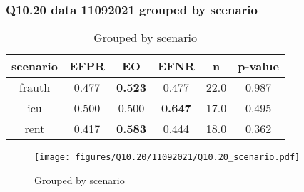 \subsubsection{Q10.20 data 11092021 grouped by scenario}

\begin{comment}
               EFPR        EO      EFNR     n    pvalue
(frauth,)  0.477273  0.522727  0.477273  22.0  0.986772
(icu,)     0.500000  0.500000  0.647059  17.0  0.494974
(rent,)    0.416667  0.583333  0.444444  18.0  0.361935
\end{comment}

\begin{table}[h]
    \centering
    \begin{tabular}{|c|c|c|c|c|c|}
        \hline
        scenario & EFPR & EO & EFNR & n & p-value\\
        \hline
        frauth & 0.477 & \textbf{0.523} & 0.477 & 22.0 & 0.987\\
		icu & 0.500 & 0.500 & \textbf{0.647} & 17.0 & 0.495\\
		rent & 0.417 & \textbf{0.583} & 0.444 & 18.0 & 0.362\\
		
        \hline
    \end{tabular}
    \caption{Grouped by scenario}
    \label{tab:my_label}
\end{table}
\begin{figure}[h]
    \centering
    \texttt{[image: figures/Q10.20/11092021/Q10.20\_scenario.pdf]}
    \caption{Grouped by scenario}
    \label{fig:my_label}
\end{figure}
